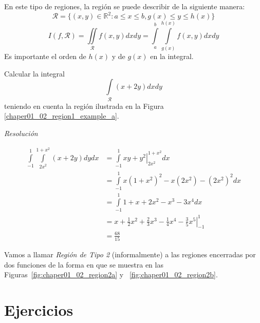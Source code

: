 



En este tipo de regiones, la regi\'on se puede describir de la siguiente manera:
$$
\mathcal{R} = \lbrace (x,y) \in \mathbb{R}^2: a \leq x \leq b, g(x) \leq y \leq h(x) \rbrace
$$
$$
I(f, \mathcal{R}) = \iint\limits_\mathcal{R} f(x,y) dxdy = \int\limits_a^b \int\limits_{g(x)}^{h(x)}f(x,y)dxdy
$$
Es importante el orden de $h(x)$ y de $g(x)$ en la integral.

\begin{example}

Calcular la integral 
$$
\int\limits_\mathcal{R} (x + 2y) dxdy
$$
teniendo en cuenta la regi\'on ilustrada en la Figura \ref{chaper01_02_region1_example_a}.



\emph{Resoluci\'on}

\begin{equation*}
	\begin{split}
		\int\limits_{-1}^1 \int\limits_{2x^2}^{1+x^2} (x+2y) dy dx &= \int\limits_{-1}^1 \left. xy + y^2 \right|^{1+ x^2}_{2x^2} dx \\
		&= \int\limits_{-1}^1 x(1+x^2)^2 -x(2x^2) - (2x^2)^2 dx \\
		&= \int\limits_{-1}^1 1 + x + 2x^2 - x^3 - 3x^4 dx \\
		&= \left. x + \frac{1}{2}x^2 + \frac{2}{3}x^3 -\frac{1}{4}x^4 - \frac{3}{5} x^5 \right|^1_{-1} \\
		&= \frac{68}{15}
	\end{split}
\end{equation*}

\end{example}

Vamos a llamar \emph{Regi\'on de Tipo 2} (informalmente) a las regiones encerradas por dos funciones de la forma en que se muestra en las Figuras~\ref{fig:chaper01_02_region2a} y ~\ref{fig:chaper01_02_region2b}.

\section{Ejercicios}

